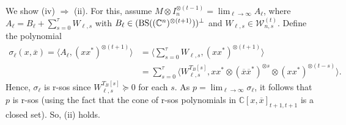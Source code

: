 \documentclass[11pt]{article}
\makeatletter
\newcommand{\C}{\ensuremath{\mathbb{C}}} %
\newcommand{\MW}{{\mathcal W}}
\newcommand{\ot}{\otimes}
\newcommand{\BS}{\text{\rm BS}}
\newcommand{\ovx}{\overline x}
\theoremstyle{plain}
\renewenvironment{proof}[1][\proofname]{%
  \par
  \pushQED{}%
  \normalfont
  \topsep6\p@\@plus6\p@
  \trivlist
  \item[\hskip\labelsep\itshape #1\@addpunct{.}]%
}{%
  \popQED
  \endtrivlist
}
\makeatother
\begin{document}
\begin{proof}[Proof of Theorem \ref{theo:FF-BS}]
\medskip
We show  (iv) $\Longrightarrow$ (ii).
For  this, assume $M\ot I_n^{\ot (t-1)}=\lim_{\ell \to\infty} A_\ell$, where 
$A_\ell = B_\ell +\sum_{s=0}^\tau W_{\ell,s}$ with $B_\ell\in (\BS((\C^n)^{\ot (t+1)}))^{\perp}$ and $W_{\ell,s}\in \MW^{(t)}_{n,s}$. Define the polynomial 
\begin{align*}
\sigma_\ell(x,\ovx)=\langle A_\ell, (xx^*)^{\ot (t+1)}\rangle 
& = 
\big\langle \sum_{s=0}^\tau  W_{\ell,s}, (xx^*)^{\ot (t+1)}\big\rangle \\
& =
 \sum_{s=0}^\tau \langle W_{\ell,s}^{T_B[s]}, x x^*\ot (\ovx \ovx^*)^{\ot s}\ot (xx^*)^{\ot (t-s)} \rangle.
\end{align*}
Hence, $\sigma_\ell $ is r-sos since   $W_{\ell,s}^{T_B[s]}\succeq 0$ for each $s$.
As $p=\lim_{\ell\to\infty} \sigma_\ell$,  it follows that  $p$ is r-sos   (using the fact that 
the cone of r-sos polynomials in $\C[x,\ovx]_{t+1,t+1}$  is a closed set).  So, (ii) holds.


\end{proof}
\end{document}
